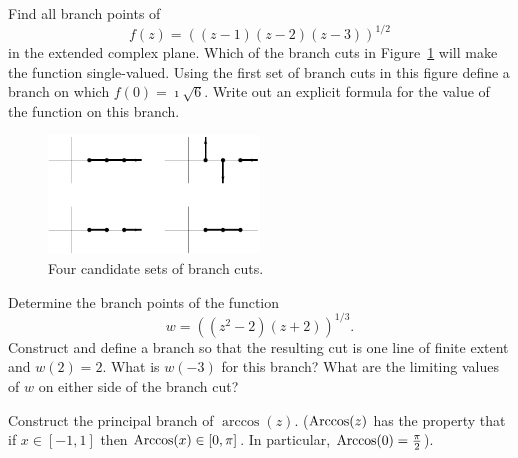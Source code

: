 {%
\begin{Exercise}
  \label{exercise z1z2z3}
  Find all branch points of 
  \[
  f(z) = ((z-1)(z-2)(z-3))^{1/2}
  \]
  in the extended complex plane.  Which of the branch cuts in
  Figure~\ref{bpbc123} will make the function single-valued.  Using
  the first set of branch cuts in this figure define a branch on which
  $f(0) = \imath \sqrt{6}$.  Write out an explicit formula for the value
  of the function on this branch.
  \begin{figure}[htbp!]
    \begin{center}
      \includegraphics[width=0.5\textwidth]{fcv/function/bpbc123}
    \end{center}
    \caption{Four candidate sets of branch cuts.}
    \label{bpbc123}
  \end{figure}

\end{Exercise}






\begin{Exercise}
  \label{exercise z22z2}
  Determine the branch points of the function
  \[
  w = \left( \left( z^2 - 2 \right) (z + 2) \right)^{1/3}.
  \]
  Construct and define a branch so that the resulting cut is one line of 
  finite extent and $w(2) = 2$.  What is $w(-3)$ for this branch?  What are 
  the limiting values of $w$ on either side of the branch cut?

\end{Exercise}








\begin{Exercise}
  \label{exercise pb arccos}
  Construct the principal branch of $\arccos(z)$.  ($\mathop{\mathrm{Arccos}}\nolimits(z)$ has the 
  property that if $x \in [-1,1]$ then $\mathop{\mathrm{Arccos}}\nolimits(x) \in [0,\pi]$.  In 
  particular, $\mathop{\mathrm{Arccos}}\nolimits(0) = \frac{\pi}{2}$).

\end{Exercise}





}
